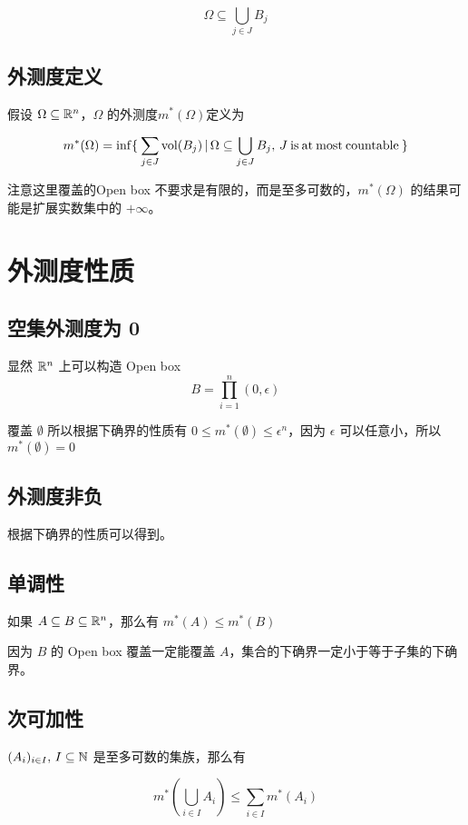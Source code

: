 \[
\Omega \subseteq \bigcup_{j \in J} B_j
\]

\subsection{外测度定义}

假设 $\Omega \subseteq \mathbb{R}^n$，$\Omega$ 的外测度$m^*(\Omega)$定义为

\[
m^*(\Omega) = \inf \{\: \sum_{j \in J}\mathrm{vol}(B_j) \,\vert\, \Omega \subseteq \bigcup_{j \in J}B_j,\, J \: \mathrm{ is \: at \: most \: countable} \:\}
\]

注意这里覆盖的Open box 不要求是有限的，而是至多可数的，$m^*(\Omega)$ 的结果可能是扩展实数集中的 $+\infty$。


\section{外测度性质}

\subsection{空集外测度为 0}

显然 $\mathbb{R}^n$ 上可以构造 Open box 
\[
B = \prod_{i=1}^{n}(0, \epsilon)
\]

覆盖 $\emptyset$ 所以根据下确界的性质有 $ 0 \le m^*(\emptyset) \le \epsilon^n$，因为 $\epsilon$ 可以任意小，所以 $m^*(\emptyset) = 0$

\subsection{外测度非负}

根据下确界的性质可以得到。

\subsection{单调性}

如果 $A \subseteq B \subseteq \mathbb{R}^n$，那么有 $m^*(A) \le m^*(B)$

因为 $B$ 的 Open box 覆盖一定能覆盖 $A$，集合的下确界一定小于等于子集的下确界。

\subsection{次可加性}

$(A_i)_{i \in I},\, I \subseteq \mathbb{N}$ 是至多可数的集族，那么有

\[
m^*(\bigcup_{i \in I}A_i) \le \sum_{i \in I}m^*(A_i)
\]

